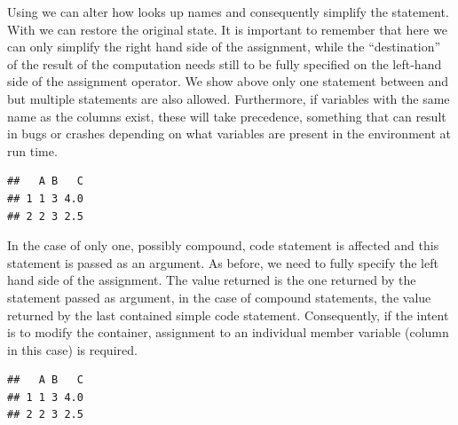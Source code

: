 \documentclass[krantz2]{krantz}\usepackage{knitr}%
\begin{document}
\begin{explainbox}
Using  we can alter how \Rlang looks up names and consequently simplify the statement. With  we can restore the original state. It is important to remember that here we can only simplify the right hand side of the assignment, while the ``destination'' of the result of the computation needs still to be fully specified on the left-hand side of the assignment operator. We show above only one statement between  and  but multiple statements are also allowed. Furthermore, if variables with the same name as the columns exist, these will take precedence, something that can result in bugs or crashes depending on what variables are present in the \Rlang environment at run time.

\begin{knitrout}\footnotesize
{}\color{fgcolor}\begin{kframe}
\begin{alltt}
\hlopt{$} \hlkwb{<-} 
\hlopt{$} \hlkwb{<-}  \hlopt{+}  \hlopt{/} 
 \hlstd{)}
\end{alltt}
\begin{verbatim}
##   A B   C
## 1 1 3 4.0
## 2 2 3 2.5
\end{verbatim}
\end{kframe}
\end{knitrout}

In the case of  only one, possibly compound, code statement is affected and this statement is passed as an argument. As before, we need to fully specify the left hand side of the assignment. The value returned is the one returned by the statement passed as argument, in the case of compound statements, the value returned by the last contained simple code statement. Consequently, if the intent is to modify the container, assignment to an individual member variable (column in this case) is required.

\begin{knitrout}\footnotesize
{}\color{fgcolor}\begin{kframe}
\begin{alltt}
\hlopt{$} \hlkwb{<-} 
\hlopt{$} \hlkwb{<-}  \hlopt{+}  \hlopt{/} 
 \hlstd{)}
\end{alltt}
\begin{verbatim}
##   A B   C
## 1 1 3 4.0
## 2 2 3 2.5
\end{verbatim}
\end{kframe}
\end{knitrout}


\end{explainbox}
\end{document}
